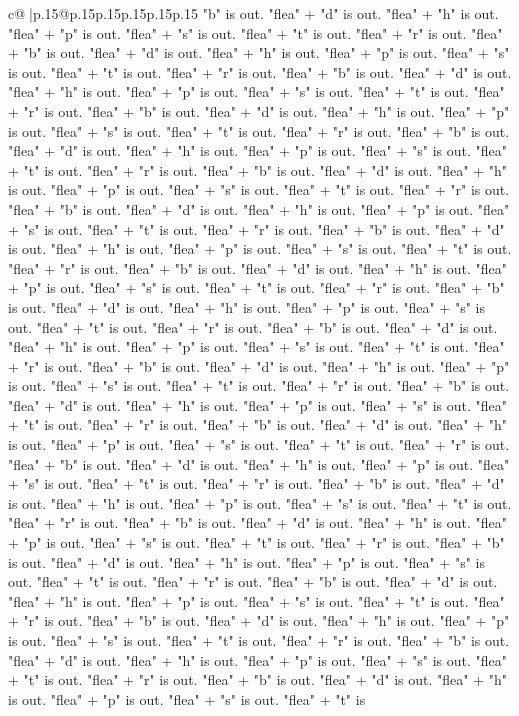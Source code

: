 \documentclass{article}
\begin{document}
{\begin{supertabular}{c@{$\;$}|p{.15\linewidth}@{}p{.15\linewidth}p{.15\linewidth}p{.15\linewidth}p{.15\linewidth}p{.15\linewidth}}
{{{"b" is out. "flea" + "d" is out. "flea" + "h" is out. "flea" + "p" is out. "flea" + "s" is out. "flea" + "t" is out. "flea" + "r" is out. "flea" + "b" is out. "flea" + "d" is out. "flea" + "h" is out. "flea" + "p" is out. "flea" + "s" is out. "flea" + "t" is out. "flea" + "r" is out. "flea" + "b" is out. "flea" + "d" is out. "flea" + "h" is out. "flea" + "p" is out. "flea" + "s" is out. "flea" + "t" is out. "flea" + "r" is out. "flea" + "b" is out. "flea" + "d" is out. "flea" + "h" is out. "flea" + "p" is out. "flea" + "s" is out. "flea" + "t" is out. "flea" + "r" is out. "flea" + "b" is out. "flea" + "d" is out. "flea" + "h" is out. "flea" + "p" is out. "flea" + "s" is out. "flea" + "t" is out. "flea" + "r" is out. "flea" + "b" is out. "flea" + "d" is out. "flea" + "h" is out. "flea" + "p" is out. "flea" + "s" is out. "flea" + "t" is out. "flea" + "r" is out. "flea" + "b" is out. "flea" + "d" is out. "flea" + "h" is out. "flea" + "p" is out. "flea" + "s" is out. "flea" + "t" is out. "flea" + "r" is out. "flea" + "b" is out. "flea" + "d" is out. "flea" + "h" is out. "flea" + "p" is out. "flea" + "s" is out. "flea" + "t" is out. "flea" + "r" is out. "flea" + "b" is out. "flea" + "d" is out. "flea" + "h" is out. "flea" + "p" is out. "flea" + "s" is out. "flea" + "t" is out. "flea" + "r" is out. "flea" + "b" is out. "flea" + "d" is out. "flea" + "h" is out. "flea" + "p" is out. "flea" + "s" is out. "flea" + "t" is out. "flea" + "r" is out. "flea" + "b" is out. "flea" + "d" is out. "flea" + "h" is out. "flea" + "p" is out. "flea" + "s" is out. "flea" + "t" is out. "flea" + "r" is out. "flea" + "b" is out. "flea" + "d" is out. "flea" + "h" is out. "flea" + "p" is out. "flea" + "s" is out. "flea" + "t" is out. "flea" + "r" is out. "flea" + "b" is out. "flea" + "d" is out. "flea" + "h" is out. "flea" + "p" is out. "flea" + "s" is out. "flea" + "t" is out. "flea" + "r" is out. "flea" + "b" is out. "flea" + "d" is out. "flea" + "h" is out. "flea" + "p" is out. "flea" + "s" is out. "flea" + "t" is out. "flea" + "r" is out. "flea" + "b" is out. "flea" + "d" is out. "flea" + "h" is out. "flea" + "p" is out. "flea" + "s" is out. "flea" + "t" is out. "flea" + "r" is out. "flea" + "b" is out. "flea" + "d" is out. "flea" + "h" is out. "flea" + "p" is out. "flea" + "s" is out. "flea" + "t" is out. "flea" + "r" is out. "flea" + "b" is out. "flea" + "d" is out. "flea" + "h" is out. "flea" + "p" is out. "flea" + "s" is out. "flea" + "t" is out. "flea" + "r" is out. "flea" + "b" is out. "flea" + "d" is out. "flea" + "h" is out. "flea" + "p" is out. "flea" + "s" is out. "flea" + "t" is out. "flea" + "r" is out. "flea" + "b" is out. "flea" + "d" is out. "flea" + "h" is out. "flea" + "p" is out. "flea" + "s" is out. "flea" + "t" is out. "flea" + "r" is out. "flea" + "b" is out. "flea" + "d" is out. "flea" + "h" is out. "flea" + "p" is out. "flea" + "s" is out. "flea" + "t" is out. "flea" + "r" is out. "flea" + "b" is out. "flea" + "d" is out. "flea" + "h" is out. "flea" + "p" is out. "flea" + "s" is out. "flea" + "t" is out. "flea" + "r" is out. "flea" + "b" is out. "flea" + "d" is out. "flea" + "h" is out. "flea" + "p" is out. "flea" + "s" is out. "flea" + "t" is }}}
\end{supertabular}}
\end{document}
